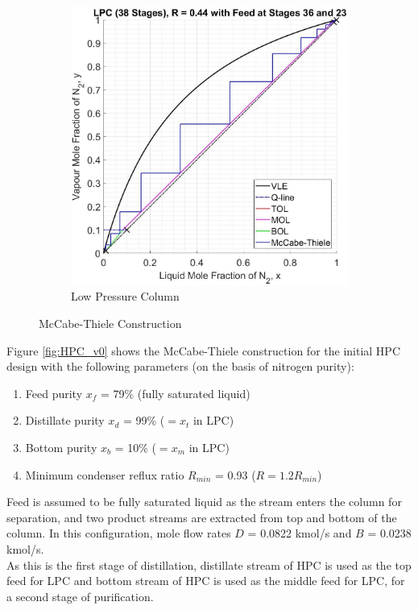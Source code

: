 \begin{figure}[H]
\begin{subfigure}{0.49\textwidth}
                \includegraphics[width=\linewidth]{airseparation/graphics/LPC_v0.jpg}
                \caption{Low Pressure Column}
                \label{fig:LPC_v0}
            \end{subfigure}
            \caption{McCabe-Thiele Construction}                        \label{fig:mccabe_v0}
        \end{figure}
        \noindent Figure \ref{fig:HPC_v0} shows the McCabe-Thiele construction for the initial HPC design with the following parameters (on the basis of nitrogen purity):
        \begin{enumerate}
            \item Feed purity $x_f$ = 79\% (fully saturated liquid)
            \item Distillate purity $x_d$ = 99\% ($=x_t$ in LPC)
            \item Bottom purity $x_b$ = 10\% ($=x_m$ in LPC)
            \item Minimum condenser reflux ratio $R_{min}$ = 0.93 ($R = 1.2R_{min}$)
        \end{enumerate}
        Feed is assumed to be fully saturated liquid as the stream enters the column for separation, and two product streams are extracted from top and bottom of the column. In this configuration, mole flow rates $D$ = 0.0822 kmol/s and $B$ = 0.0238 kmol/s. \\
        As this is the first stage of distillation, distillate stream of HPC is used as the top feed for LPC and bottom stream of HPC is used as the middle feed for LPC, for a second stage of purification.\\
        
